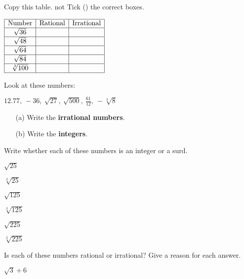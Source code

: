 \begin{multicols}{2}
\setlength{\columnseprule}{0.4pt}
\def\columnseprulecolor{\color{black}}
\begin{uzd}
Copy this table. not
Tick (\checkmark) the correct boxes.

\phantom{a}

$\begin{array}{|c|c|c|}
\hline
\text{Number} & \text{Rational} & \text{Irrational} \\
\hline
\sqrt{36} & & \\
\hline
\sqrt{48} & & \\
\hline
\sqrt{64} & & \\
\hline
\sqrt{84} & & \\
\hline
\sqrt[3]{100} & & \\
\hline
\end{array}$
\end{uzd}

\begin{uzd}
Look at these numbers:

$12.77, \ -36, \ \sqrt{27}, \ \sqrt{500}, \ \tfrac{61}{12}, \ -\sqrt[3]{8}$

\begin{itemize}
\item[(a)] Write the \textbf{irrational numbers}.
\item[(b)] Write the \textbf{integers}.
\end{itemize}
\end{uzd}

\begin{uzd}
Write whether each of these numbers is an integer or a surd.

\resetcolumnrule
\begin{multicols}{3}
 $\sqrt{25}$

 $\sqrt[3]{25}$

 $\sqrt{125}$

 $\sqrt[3]{125}$

 $\sqrt{225}$

 $\sqrt[3]{225}$
\end{multicols}
\end{uzd}


\begin{uzd}
Is each of these numbers rational or irrational? Give a reason for each answer.

\resetcolumnrule
\begin{multicols}{2}
 $\sqrt{3} + 6$


\end{multicols}
\end{uzd}
\end{multicols}
